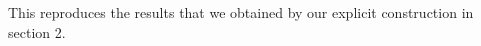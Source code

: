 \documentclass[12pt]{article}
\theoremstyle{definition}
\newcommand{\be}{\begin{equation}}
\newcommand{\ee}{\end{equation}}
\begin{document}
This reproduces the results that we obtained by our explicit construction in section 2.

\end{document}
